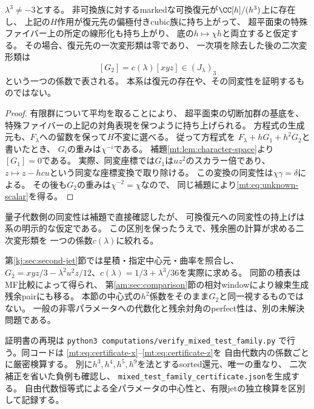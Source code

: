 \begin{corollary}[marked同変復元を仮定した二次係数の制約]
\label{mt:cor:second-character}
$\lambda^3\ne-3$とする。
非可換族に対するmarkedな可換復元が$\CC[h]/(h^3)$上に存在し、
上記の$H$作用が復元先の偏極付きcubic族に持ち上がって、
超平面束の特殊ファイバー上の所定の線形化も持ち上がり、
底の$h\mapsto\chi h$と両立すると仮定する。
その場合、復元先の一次変形類は零であり、
一次項を除去した後の二次変形類は
\begin{equation}\label{mt:eq:unknown-scalar}
 [G_2]=c(\lambda)[xyz]\in (J_\lambda)_3
\end{equation}
という一つの係数で表される。
本系は復元の存在や、その同変性を証明するものではない。
\end{corollary}
\begin{proof}
有限群について平均を取ることにより、
超平面束の切断加群の基底を、特殊ファイバーの上記の対角表現を保つように持ち上げられる。
方程式の生成元も、$F_\lambda$への留数を保って$H$不変に選べる。
従って方程式を
$F_\lambda+hG_1+h^2G_2$と書いたとき、
$G_i$の重みは$\chi^{-i}$である。
補題\ref{mt:lem:character-space}より$[G_1]=0$である。
実際、同変座標では$G_1$は$uz^2$のスカラー倍であり、
$z\mapsto z-hc u$という同変な座標変換で取り除ける。
この変換の同変性は$\chi\gamma=\delta$による。
その後も$G_2$の重みは$\chi^{-2}=\chi$なので、
同じ補題により\eqref{mt:eq:unknown-scalar}を得る。
\end{proof}

量子代数側の同変性は補題で直接確認したが、
可換復元への同変性の持上げは系の明示的な仮定である。
この区別を保ったうえで、残余圏の計算が求める二次変形類を
一つの係数$c(\lambda)$に絞れる。

第\ref{kj:sec:second-jet}節では星積・指定中心元・曲率を照合し、
$G_2=xyz/3-\lambda^2u^2z/12$、$c(\lambda)=1/3+\lambda^3/36$を実際に求める。
同節の積表はMF比較によって得られ、
第\ref{am:sec:comparison}節の相対windowにより線束生成残余pairにも移る。
本節の中心式の$h^2$係数をそのまま$G_2$と同一視するものではない。
一般の非零パラメータへの代数化と残余対角のperfect性は、別の未解決問題である。

証明書の再現は
\texttt{python3 computations/verify\_mixed\_test\_family.py}
で行う。同コードは
\eqref{mt:eq:certificate-x}--\eqref{mt:eq:certificate-z}を
自由代数内の係数ごとに厳密検算する。
別に$h^3,h^4,h^5,h^9$を法とするsorted還元、唯一の重なり、
二次補正を省いた負例も確認し、
\texttt{mixed\_test\_family\_certificate.json}を生成する。
自由代数恒等式による全パラメータの中心性と、有限jetの独立検算を区別して記録する。

